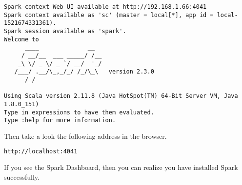 \begin{lstlisting}
Spark context Web UI available at http://192.168.1.66:4041
Spark context available as 'sc' (master = local[*], app id = local-1521674331361).
Spark session available as 'spark'.
Welcome to
      ____              __
     / __/__  ___ _____/ /__
    _\ \/ _ \/ _ `/ __/  '_/
   /___/ .__/\_,_/_/ /_/\_\   version 2.3.0
      /_/
         
Using Scala version 2.11.8 (Java HotSpot(TM) 64-Bit Server VM, Java 1.8.0_151)
Type in expressions to have them evaluated.
Type :help for more information.
\end{lstlisting}

Then take a look the following address in the browser.
\begin{lstlisting}
http://localhost:4041
\end{lstlisting}

If you see the Spark Dashboard, then you can realize you have installed Spark
successfully. 